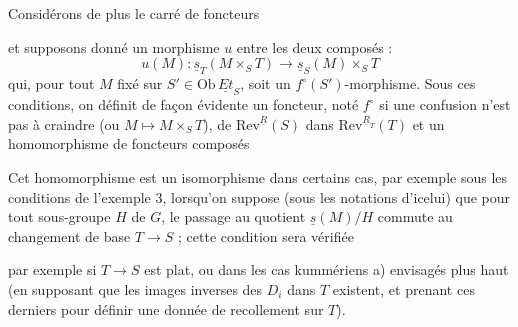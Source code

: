 \documentclass[11pt,a4paper]{article}
\begin{document}

Considérons de plus le carré de foncteurs


et supposons donné un morphisme $u$ entre les deux composés :
\[
  u(M) : \underline{s}_T(M \times_S T) \longrightarrow
  \underline{s}_S(M) \times_S T
\]
qui, pour tout $M$ fixé \struck{\ill{}} sur $S' \in \mathrm{Ob}\,\underline{Et}_S$,
soit un $f^{\circ}(S')$-morphisme. Sous ces conditions, on définit de façon
évidente un foncteur, noté $f^{\circ}$ si une confusion n'est pas à craindre
(ou $M \mapsto M \times_S T$), de $\mathrm{Rev}^{\underline{R}}(S)$ dans
$\mathrm{Rev}^{\underline{R}_T}(T)$ et un homomorphisme de foncteurs composés


Cet homomorphisme est un isomorphisme dans certains cas, par exemple sous les
conditions de l'exemple 3, lorsqu'on suppose (sous les notations d'icelui) que
pour tout sous-groupe $H$ de $G$, le passage au quotient
$\underline{s}(M)/H$ commute au changement de base $T \to S$ ; cette condition
sera vérifiée

par exemple si $T \to S$ est plat, ou dans les cas kummériens a) envisagés plus
haut (en supposant que les images inverses des $D_i$ dans $T$ existent, et
prenant ces derniers pour définir une donnée de recollement sur $T$).
\end{document}
